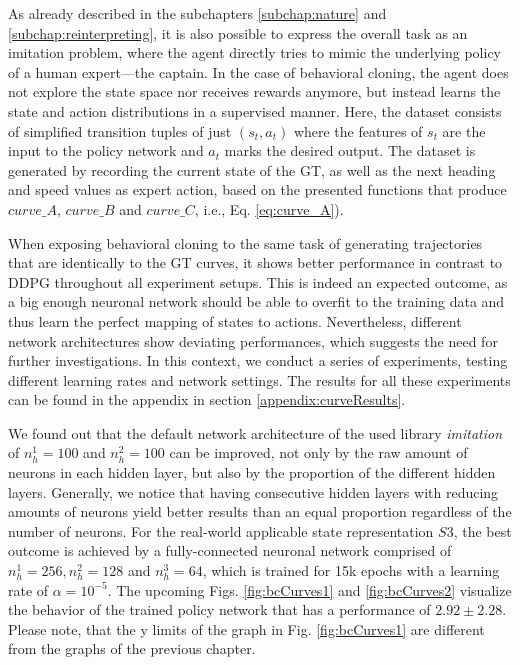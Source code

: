 As already described in the subchapters \ref{subchap:nature} and \ref{subchap:reinterpreting}, it is also possible to express the overall task as an imitation problem, where the agent directly tries to mimic the underlying policy of a human expert—the captain. In the case of behavioral cloning, the agent does not explore the state space nor receives rewards anymore, but instead learns the state and action distributions in a supervised manner. Here, the dataset consists of simplified transition tuples of just $(s_t, a_t)$ where the features of $s_t$ are the input to the policy network and $a_t$ marks the desired output. The dataset is generated by recording the current state of the GT, as well as the next heading and speed values as expert action, based on the presented functions that produce $curve\_A$, $curve\_B$ and $curve\_C$, i.e., Eq. \ref{eq:curve_A}).
\par
When exposing behavioral cloning to the same task of generating trajectories that are identically to the GT curves, it shows better performance in contrast to DDPG throughout all experiment setups. This is indeed an expected outcome, as a big enough neuronal network should be able to overfit to the training data and thus learn the perfect mapping of states to actions. Nevertheless, different network architectures show deviating performances, which suggests the need for further investigations. In this context, we conduct a series of experiments, testing different learning rates and network settings. The results for all these experiments can be found in the appendix in section \ref{appendix:curveResults}.
\par
We found out that the default network architecture of the used library \textit{imitation} of $n_{h}^{1}=100$ and $n_{h}^{2}=100$ can be improved, not only by the raw amount of neurons in each hidden layer, but also by the proportion of the different hidden layers. Generally, we notice that having consecutive hidden layers with reducing amounts of neurons yield better results than an equal proportion regardless of the number of neurons. For the real-world applicable state representation $S3$, the best outcome is achieved by a fully-connected neuronal network comprised of $n_{h}^{1}=256, n_{h}^{2}=128$ and $n_{h}^{3}=64$, which is trained for 15k epochs with a learning rate of $\alpha = 10^{-5}$. The upcoming Figs. \ref{fig:bcCurves1} and \ref{fig:bcCurves2} visualize the behavior of the trained policy network that has a performance of $2.92 \pm 2.28$. Please note, that the y limits of the graph in Fig. \ref{fig:bcCurves1} are different from the graphs of the previous chapter.

